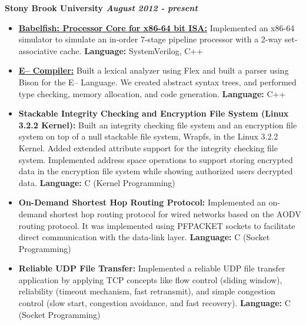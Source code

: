 \documentclass[11pt]{article}
\newenvironment{changemargin}[2]{%
  \begin{list}{}{%
    \setlength{\topsep}{0pt}%
    \setlength{\leftmargin}{#1}%
    \setlength{\rightmargin}{#2}%
    \setlength{\listparindent}{\parindent}%
    \setlength{\itemindent}{\parindent}%
    \setlength{\parsep}{\parskip}%
  }%
  \item[]}{\end{list}
}
\newenvironment{body} {
	\vspace*{-16pt}
	\begin{changemargin}{-0.25in}{-0.5in}
  }	
	{\end{changemargin}
}
\begin{document}
\begin{body}
	\vspace{14pt}
	\textbf{Stony Brook University \hfill \emph{August 2012 - present}}\\
	\vspace*{-4pt}
	\begin{itemize} \itemsep -0pt
		\item \href{https://bitbucket.org/sonamdp42/babelfish}{\textbf{Babelfish: Processor Core for x86-64 bit ISA:}} Implemented an x86-64 simulator to simulate an in-order 7-stage pipeline processor with a 2-way set-associative cache. \textbf{Language:} SystemVerilog, C++\\
		\item \href{https://github.com/sonamdp42/dory}{\textbf{E-- Compiler:}} Built a lexical analyzer using Flex and built a parser using Bison for the E-- Language. We created abstract syntax trees, and performed type checking, memory allocation, and code generation. \textbf{Language:} C++\\
		\item \textbf{Stackable Integrity Checking and Encryption File System (Linux 3.2.2 Kernel):} Built an integrity checking file system and an encryption file system on top of a null stackable file system, Wrapfs, in the Linux 3.2.2 Kernel. Added extended attribute support for the integrity checking file system. Implemented address space operations to support storing encrypted data in the encryption file system while showing authorized users decrypted data. \textbf{Language:} C (Kernel Programming)\\
		\item \textbf{On-Demand Shortest Hop Routing Protocol:} Implemented an on-demand shortest hop routing protocol for wired networks based on the AODV routing protocol. It was implemented using PF\textunderscore PACKET sockets to facilitate direct communication with the data-link layer. \textbf{Language:} C (Socket Programming)\\
		\item \textbf{Reliable UDP File Transfer:} Implemented a reliable UDP file transfer application by applying TCP concepts like flow control (sliding window), reliability (timeout mechanism, fast retransmit), and simple congestion control (slow start, congestion avoidance, and fast recovery). \textbf{Language:} C (Socket Programming)\\

\end{itemize}
\end{body}
\end{document}
